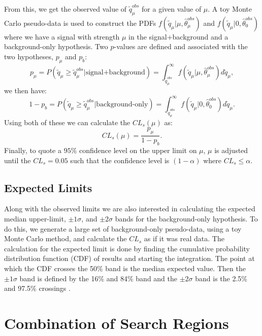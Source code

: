 From this, we get the observed value of $\widetilde{q}_\mu^{obs}$ for a given value of $\mu$. A toy Monte Carlo pseudo-data is used to construct the PDFs $f(\widetilde{q}_\mu|\mu,\hat{\theta}_\mu^{obs})$ and $f(\widetilde{q}_\mu|0,\hat{\theta}_0^{obs})$ where we have a signal with strength $\mu$ in the signal+background and a background-only hypothesis. Two $p$-values are defined and associated with the two hypotheses, $p_\mu$ and $p_b$:
\begin{equation}\label{eqn:splusb}
p_\mu=P(\widetilde{q}_\mu\geq\widetilde{q}_\mu^{obs}|\text{signal+background})=\int_{\widetilde{q}_\mu^{obs}}^{\infty}f(\widetilde{q}_\mu|\mu,\hat{\theta}_\mu^{obs})d\widetilde{q}_\mu,
\end{equation} \label{eqn:b}
we then have:
\begin{equation}
1-p_b=P(\widetilde{q}_\mu\geq\widetilde{q}_\mu^{obs}|\text{background-only})=\int_{\widetilde{q}_\mu^{obs}}^{\infty}f(\widetilde{q}_\mu|0,\hat{\theta}_0^{obs})d\widetilde{q}_\mu.
\end{equation}
Using both of these we can calculate the $CL_s(\mu)$ as:
\begin{equation}
CL_s(\mu)=\frac{p_\mu}{1-p_b}.
\end{equation}
Finally, to quote a $95\%$ confidence level on the upper limit on $\mu$, $\mu$ is adjusted until the $CL_s=0.05$ such that the confidence level is $(1-\alpha)$ where $CL_s\leq\alpha$. 

\subsection{Expected Limits}\label{sec:ExpLimits}

Along with the observed limits we are also interested in calculating the expected median upper-limit, $\pm1\sigma$, and $\pm2\sigma$ bands for the background-only hypothesis. To do this, we generate a large set of background-only pseudo-data, using a toy Monte Carlo method, and calculate the $CL_s$ as if it was real data. The calculation for the expected limit is done by finding the cumulative probability distribution function (CDF) of results and starting the integration. The point at which the CDF crosses the 50\% band is the median expected value. Then the $\pm1\sigma$ band is defined by the 16\% and 84\% band and the $\pm2\sigma$ band is the 2.5\% and 97.5\% crossings \cite{noauthor_procedure_2011}. 

\section{Combination of Search Regions}\label{sec:Combination}

